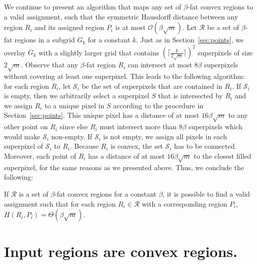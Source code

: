 \documentclass[a4paper,UKenglish,cleveref]{lipics-v2019}
\begin{document}
We continue to present an algorithm that maps any set of $\beta$-fat convex regions to a valid assignment, such that the symmetric Hausdorff distance between any region $R_i$ and its assigned region $P_i$ is at most $\mathcal{O}(\beta \sqrt{m})$. Let $\mathcal{R}$ be a set of $\beta$-fat regions in a subgrid $G_k$ for a constant $k$. Just as in Section~\ref{sec:points}, we overlay $G_k$ with a slightly larger grid that contains $(\lceil \frac{k}{2\sqrt{m}} \rceil)^2$ superpixels of size $2\sqrt{m}$. Observe that any $\beta$-fat region $R_i$ can intersect at most $8\beta$ superpixels without covering at least one superpixel. This leads to the following algorithm: for each region $R_i$, let $\mathcal{S}_i$ be the set of superpixels that are contained in $R_i$. If $\mathcal{S}_i$ is empty, then we arbitrarily select a superpixel $S$ that is intersected by $R_i$ and we assign $R_i$ to a unique pixel in $S$ according to the procedure in Section~\ref{sec:points}. This unique pixel has a distance of at most $16\beta \sqrt{m}$ to any other point on $R_i$ since else $R_i$ must intersect more than $8\beta$ superpixels which would make $\mathcal{S}_i$ non-empty. If $\mathcal{S}_i$ is not empty, we assign all pixels in each superpixel of $\mathcal{S}_i$ to $R_i$. Because $R_i$ is convex, the set $\mathcal{S}_i$ has to be connected. Moreover, each point of $R_i$ has a distance of at most $16\beta \sqrt{m}$ to the closest filled superpixel, for the same reasons as we presented above. Thus, we conclude the following:


\begin{theorem}
If $\mathcal{R}$ is a set of $\beta$-fat convex regions for a constant $\beta$, it is possible to find a valid assignment such that for each region $R_i \in \mathcal{R}$ with a corresponding region $P_i$, $H(R_i, P_i) = \Theta(\beta\sqrt{m})$.
\end{theorem}


\section{Input regions are convex regions.}\label{sec:convex}
\end{document}

